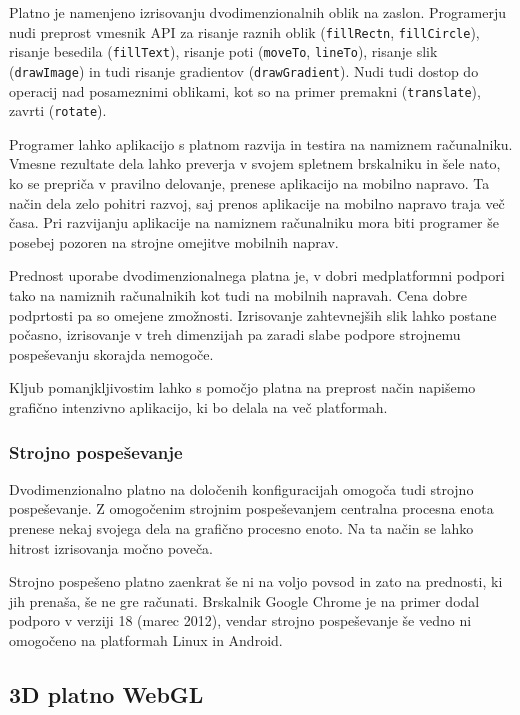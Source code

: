 
Platno je namenjeno izrisovanju dvodimenzionalnih oblik na zaslon. Programerju nudi preprost vmesnik API za risanje raznih oblik (\texttt{fillRectn}, \texttt{fillCircle}), risanje besedila (\texttt{fillText}), risanje poti (\texttt{moveTo}, \texttt{lineTo}), risanje slik (\texttt{drawImage}) in tudi risanje gradientov (\texttt{drawGradient}). Nudi tudi dostop do operacij nad posameznimi oblikami, kot so na primer premakni (\texttt{translate}), zavrti (\texttt{rotate}). 

Programer lahko aplikacijo s platnom razvija in testira na namiznem računalniku. Vmesne rezultate dela lahko preverja v svojem spletnem brskalniku in šele nato, ko se prepriča v pravilno delovanje, prenese aplikacijo na mobilno napravo. Ta način dela zelo pohitri razvoj, saj prenos aplikacije na mobilno napravo traja več časa. Pri razvijanju aplikacije na namiznem računalniku mora biti programer še posebej pozoren na strojne omejitve mobilnih naprav. 

Prednost uporabe dvodimenzionalnega platna je, v dobri medplatformni podpori tako na namiznih računalnikih kot tudi na mobilnih napravah. Cena dobre podprtosti pa so omejene zmožnosti. Izrisovanje zahtevnejših slik lahko postane počasno, izrisovanje v treh dimenzijah pa zaradi slabe podpore strojnemu pospeševanju skorajda nemogoče. 

Kljub pomanjkljivostim lahko s pomočjo platna na preprost način napišemo grafično intenzivno aplikacijo, ki bo delala na več platformah. 

\subsubsection{Strojno pospeševanje}

Dvodimenzionalno platno na določenih konfiguracijah omogoča tudi strojno pospeševanje. Z omogočenim strojnim pospeševanjem centralna procesna enota prenese nekaj svojega dela na grafično procesno enoto. Na ta način se lahko hitrost izrisovanja močno poveča.

Strojno pospešeno platno zaenkrat še ni na voljo povsod in zato na prednosti, ki jih prenaša, še ne gre računati. Brskalnik Google Chrome je na primer dodal podporo v verziji 18 (marec 2012), vendar strojno pospeševanje še vedno ni omogočeno na platformah Linux in Android.

\subsection{3D platno WebGL}
\label{sec:WebGL}

